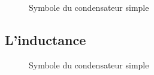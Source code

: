 \begin{figure}[!h]
\centering

\caption{Symbole du condensateur simple}
\end{figure}




\subsection{ L'inductance }

\begin{figure}[!h]
\centering

\caption{Symbole du condensateur simple}
\end{figure}



